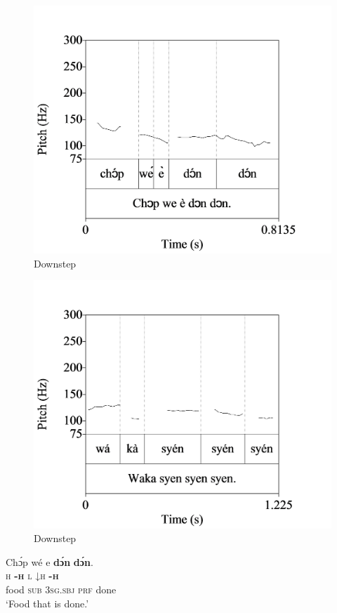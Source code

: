 \begin{figure}
\caption{Downstep}
\label{fig:key:3.17}
\includegraphics[height=.3\textheight]{figures/yakpomod-img19.png}
\end{figure}

\begin{figure}    
\caption{Downstep}
\label{fig:key:3.18}
\includegraphics[height=.3\textheight]{figures/yakpomod-img20.png} 
\end{figure}

\ea\label{ex:key:56}
\glll Chɔ́p  wé  e    \textbf{dɔ́n}  \textbf{dɔ́n}.\\
\textsc{h}    \textbf{\textsc{{}-h}}  \textsc{l}    \textsc{↓}\textsc{h}  \textbf{\textsc{{}-h}} \\
food    \textsc{sub}  \textsc{3sg.sbj}  \textsc{prf}  done\\
\glt ‘Food that is done.’
\z

